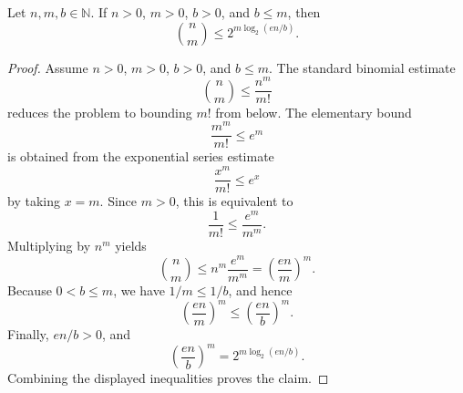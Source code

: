 \begin{helper}
Let \(n,m,b\in\mathbb N\).  If \(n>0\), \(m>0\), \(b>0\), and \(b\le m\), then
\[
  \binom{n}{m}\le
  2^{m\log_2\left(e n/b\right)}.
\]
\end{helper}
\begin{proof}
Assume \(n>0\), \(m>0\), \(b>0\), and \(b\le m\).  The standard binomial estimate
\[
  \binom{n}{m}\le \frac{n^m}{m!}
\]
reduces the problem to bounding \(m!\) from below.  The elementary bound
\[
  \frac{m^m}{m!}\le e^m
\]
is obtained from the exponential series estimate
\[
  \frac{x^m}{m!}\le e^x
\]
by taking \(x=m\).  Since \(m>0\), this is equivalent to
\[
  \frac1{m!}\le \frac{e^m}{m^m}.
\]
Multiplying by \(n^m\) yields
\[
  \binom{n}{m}\le n^m\frac{e^m}{m^m}
  =\left(\frac{en}{m}\right)^m.
\]
Because \(0<b\le m\), we have \(1/m\le1/b\), and hence
\[
  \left(\frac{en}{m}\right)^m
  \le
  \left(\frac{en}{b}\right)^m.
\]
Finally, \(en/b>0\), and
\[
  \left(\frac{en}{b}\right)^m
  =
  2^{m\log_2(en/b)}.
\]
Combining the displayed inequalities proves the claim.
\end{proof}
